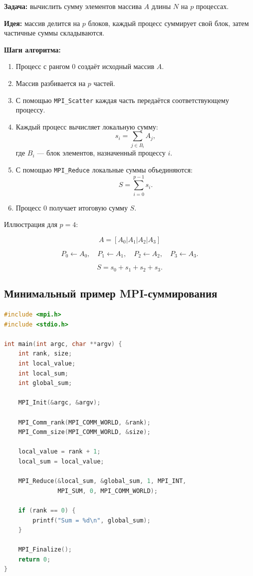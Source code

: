 \documentclass[12pt,a4paper]{article}
\begin{document}
\textbf{Задача:} вычислить сумму элементов массива $A$ длины $N$ на $p$ процессах.

\textbf{Идея:} массив делится на $p$ блоков, каждый процесс суммирует свой блок, затем частичные суммы складываются.

\textbf{Шаги алгоритма:}
\begin{enumerate}
    \item Процесс с рангом $0$ создаёт исходный массив $A$.
    \item Массив разбивается на $p$ частей.
    \item С помощью \texttt{MPI\_Scatter} каждая часть передаётся соответствующему процессу.
    \item Каждый процесс вычисляет локальную сумму:
    \[
    s_i = \sum_{j \in B_i} A_j,
    \]
    где $B_i$ --- блок элементов, назначенный процессу $i$.
    \item С помощью \texttt{MPI\_Reduce} локальные суммы объединяются:
    \[
    S = \sum_{i=0}^{p-1} s_i.
    \]
    \item Процесс $0$ получает итоговую сумму $S$.
\end{enumerate}

Иллюстрация для $p=4$:

\[
A = [A_0|A_1|A_2|A_3]
\]

\[
P_0 \leftarrow A_0,\quad
P_1 \leftarrow A_1,\quad
P_2 \leftarrow A_2,\quad
P_3 \leftarrow A_3.
\]

\[
S = s_0+s_1+s_2+s_3.
\]

\subsection{Минимальный пример MPI-суммирования}

\begin{lstlisting}[language=C]
#include <mpi.h>
#include <stdio.h>

int main(int argc, char **argv) {
    int rank, size;
    int local_value;
    int local_sum;
    int global_sum;

    MPI_Init(&argc, &argv);

    MPI_Comm_rank(MPI_COMM_WORLD, &rank);
    MPI_Comm_size(MPI_COMM_WORLD, &size);

    local_value = rank + 1;
    local_sum = local_value;

    MPI_Reduce(&local_sum, &global_sum, 1, MPI_INT,
               MPI_SUM, 0, MPI_COMM_WORLD);

    if (rank == 0) {
        printf("Sum = %d\n", global_sum);
    }

    MPI_Finalize();
    return 0;
}
\end{lstlisting}
\end{document}
